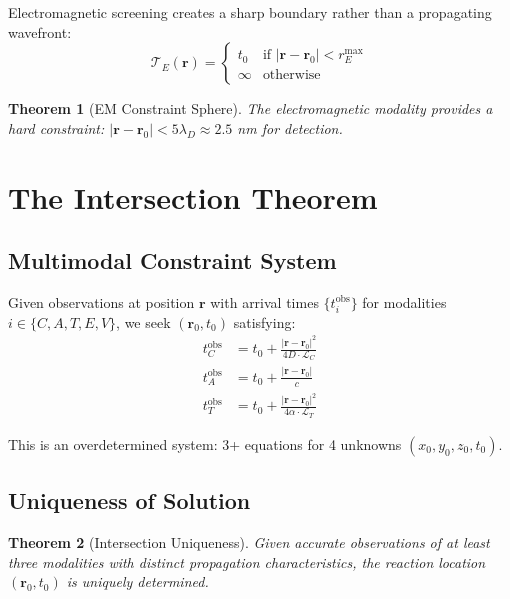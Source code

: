\documentclass[11pt,a4paper]{article}
\newtheorem{theorem}{Theorem}[section]
\theoremstyle{remark}
\newcommand{\rxnpos}{\mathbf{r}_0}
\newcommand{\rxntime}{t_0}
\newcommand{\obspos}{\mathbf{r}}
\begin{document}
Electromagnetic screening creates a sharp boundary rather than a propagating wavefront:
\begin{equation}
    \mathcal{T}_E(\obspos) = \begin{cases}
        \rxntime & \text{if } |\obspos - \rxnpos| < r_E^{\max} \\
        \infty & \text{otherwise}
    \end{cases}
\end{equation}

\begin{theorem}[EM Constraint Sphere]
\label{thm:em_sphere}
The electromagnetic modality provides a hard constraint: $|\obspos - \rxnpos| < 5\lambda_D \approx 2.5$ nm for detection.
\end{theorem}

\section{The Intersection Theorem}
\label{sec:intersection}

\subsection{Multimodal Constraint System}

Given observations at position $\obspos$ with arrival times $\{t_i^{\text{obs}}\}$ for modalities $i \in \{C, A, T, E, V\}$, we seek $(\rxnpos, \rxntime)$ satisfying:
\begin{align}
    t_C^{\text{obs}} &= \rxntime + \frac{|\obspos - \rxnpos|^2}{4D \cdot \mathcal{L}_C} \\
    t_A^{\text{obs}} &= \rxntime + \frac{|\obspos - \rxnpos|}{c} \\
    t_T^{\text{obs}} &= \rxntime + \frac{|\obspos - \rxnpos|^2}{4\alpha \cdot \mathcal{L}_T}
\end{align}

This is an overdetermined system: 3+ equations for 4 unknowns $(x_0, y_0, z_0, \rxntime)$.

\subsection{Uniqueness of Solution}

\begin{theorem}[Intersection Uniqueness]
\label{thm:intersection}
Given accurate observations of at least three modalities with distinct propagation characteristics, the reaction location $(\rxnpos, \rxntime)$ is uniquely determined.
\end{theorem}
\end{document}
